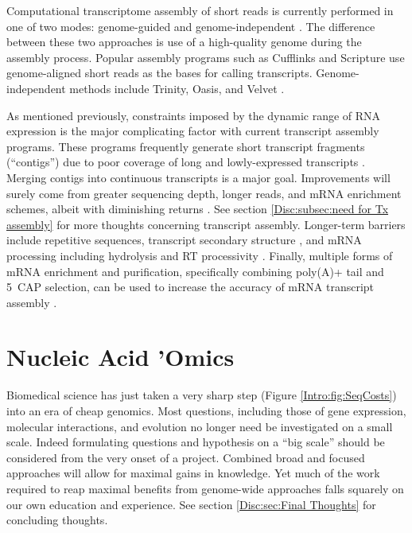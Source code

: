     Computational transcriptome assembly of short reads is currently performed in one of two modes: genome-guided and genome-independent \citep{Garber2011a}. The difference between these two approaches is use of a high-quality genome during the assembly process. Popular assembly programs such as Cufflinks \citep{Trapnell2010} and Scripture \citep{Guttman2010} use genome-aligned short reads as the bases for calling transcripts. Genome-independent methods include Trinity, Oasis, and Velvet \citep{Haas2013c,Schulz2012,Zerbino2008}.

    As mentioned previously, constraints imposed by the dynamic range of RNA expression is the major complicating factor with current transcript assembly programs. These programs frequently generate short transcript fragments (``contigs'') due to poor coverage of long and lowly-expressed transcripts \citep{Rehrauer2013,Steijger2013}. Merging contigs into  continuous transcripts is a major goal. Improvements will surely come from greater sequencing depth, longer reads, and mRNA enrichment schemes, albeit with diminishing returns \citep{Chang2014c}. See section \ref{Disc:subsec:need for Tx assembly} for more thoughts concerning transcript assembly. Longer-term barriers include repetitive sequences, transcript secondary structure \citep{Wan2014}, and mRNA processing including hydrolysis and RT processivity \citep{Sharon2013}. Finally, multiple forms of mRNA enrichment and purification, specifically combining poly(A)+ tail and 5\textprime~CAP selection, can be used to increase the accuracy of mRNA transcript assembly \citep{Blower2013}. 

\section{Nucleic Acid 'Omics}
  \label{Intro:sec:Unique Time in Omics}

  Biomedical science has just taken a very sharp step (Figure \ref{Intro:fig:SeqCosts}) into an era of cheap genomics. Most questions, including those of gene expression, molecular interactions, and evolution no longer need be investigated on a small scale. Indeed formulating questions and hypothesis on a ``big scale'' should be considered from the very onset of a project. Combined broad and focused approaches will allow for maximal gains in knowledge. Yet much of the work required to reap maximal benefits from genome-wide approaches falls squarely on our own education and experience. See section \ref{Disc:sec:Final Thoughts} for concluding thoughts.

\cleardoublepage %
